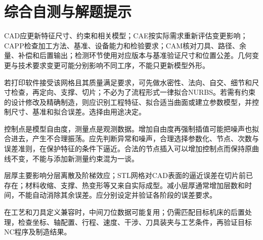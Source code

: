 \clearpage
\section{综合自测与解题提示}
\sol CAD应更新特征尺寸、约束和相关模型；CAE按实际需求重新评估变更影响；CAPP检查加工方法、基准、设备能力和检验要求；CAM核对刀具、路径、余量、补偿和后置输出；检测环节使用对应版本与基准验证尺寸和位置公差。几何变更与技术要求变更可能分别影响不同工序，不能只更新模型外形。

\sol 若打印软件接受该网格且其质量满足要求，可先做水密性、法向、自交、细节和尺寸检查，再定向、支撑、切片；不必为了流程形式一律拟合NURBS。若需有约束的设计修改及精确制造，则应识别工程特征、拟合适当曲面或建立参数模型，并控制尺寸、基准和拟合误差。选择由用途决定。

\sol 控制点是模型自由度，测量点是观测数据。增加自由度再强制插值可能把噪声也拟合进去，产生不合理振荡。应先判断异常和噪声，合理选择参数化、节点、次数与误差准则，在保护特征的条件下逼近。合法的节点插入可以增加控制点而保持原曲线不变，不能与添加新测量约束混为一谈。

\sol 层厚主要影响分层离散及阶梯效应；STL网格对CAD表面的逼近误差在切片前已存在；材料收缩、支撑、热变形等又来自实际成型。减小层厚通常增加层数和时间，不能自动消除其余误差。应分别设定并验证各阶段的误差要求。

\sol 在工艺和刀具定义兼容时，中间刀位数据可能复用；仍需匹配目标机床的后置处理，检查坐标、轴配置、行程、速度、干涉、刀具装夹与工艺条件，再验证目标NC程序及制造结果。

